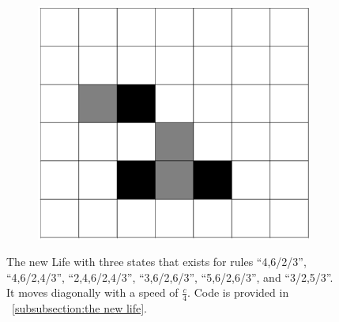 \documentclass[12pt]{article}
\numberwithin{figure}{section} %
\begin{document}
\begin{figure}[H]
        \begin{subfigure}{0.18\textwidth}
     		\centering
     		\includegraphics[width=\linewidth]{Section4/30.4}
     		\subcaption{}
   	\end{subfigure}
   	\caption[The new Life]{The new Life with three states that exists for rules “4,6/2/3”, “4,6/2,4/3”, “2,4,6/2,4/3”, “3,6/2,6/3”, “5,6/2,6/3”, and “3/2,5/3”. It moves diagonally with a speed of $\frac{c}{4}$. Code is provided in ~\ref{subsubsection:the new life}.}
   	\label{fig:the new life}
      	\vspace{-1.5em}
\end{figure}
\end{document}
